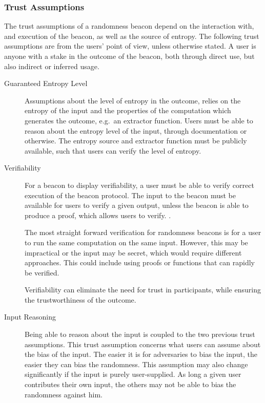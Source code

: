 \subsubsection{Trust Assumptions}\label{ssub:trust_assumptions}
The trust assumptions of a randomness beacon depend on the interaction with, and execution of the beacon, as well as the source of entropy.
The following trust assumptions are from the users' point of view, unless otherwise stated.
A user is anyone with a stake in the outcome of the beacon, both through direct use, but also indirect or inferred usage.
\begin{description}

    \item[Guaranteed Entropy Level]
        Assumptions about the level of entropy in the outcome, relies on the entropy of the input and the properties of the computation which generates the outcome, e.g.\ an extractor function.
        Users must be able to reason about the entropy level of the input, through documentation or otherwise.
        The entropy source and extractor function must be publicly available, such that users can verify the level of entropy.

    \item[Verifiability]
        For a beacon to display verifiability, a user must be able to verify correct execution of the beacon protocol.
        The input to the beacon must be available for users to verify a given output, unless the beacon is able to produce a proof, which allows users to verify. .

        The most straight forward verification for randomness beacons is for a user to run the same computation on the same input. However, this may be impractical or the input may be secret, which would require different approaches. This could include using proofs or functions that can rapidly be verified.

        Verifiability can eliminate the need for trust in participants, while ensuring the trustworthiness of the outcome.

    \item[Input Reasoning]
        Being able to reason about the input is coupled to the two previous trust assumptions. This trust assumption concerns what users can assume about the bias of the input.
        The easier it is for adversaries to bias the input, the easier they can bias the randomness.
        This assumption may also change significantly if the input is purely user-supplied. As long a given user contributes their own input, the others may not be able to bias the randomness against him.

\end{description}



